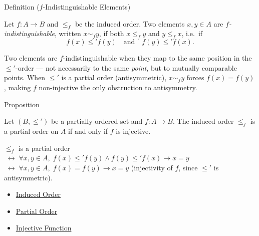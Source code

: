 
\begin{definitionbox}{Definition ($f$-Indistinguishable Elements)}
\begin{definition}\label{def:f-indist}
Let $f : A \to B$ and $\leq_f$ be the induced order. Two elements
$x, y \in A$ are \emph{$f$-indistinguishable}, written $x \sim_f y$,
if both $x \leq_f y$ and $y \leq_f x$, i.e.\ if
\[
f(x) \leq' f(y) \quad \text{and} \quad f(y) \leq' f(x).
\]
\end{definition}
\end{definitionbox}

\begin{remark*}[Intuition]
Two elements are $f$-indistinguishable when they map to the same position
in the $\leq'$-order — not necessarily to the same \emph{point}, but to
mutually comparable points. When $\leq'$ is a partial order (antisymmetric),
$x \sim_f y$ forces $f(x) = f(y)$, making $f$ non-injective the only
obstruction to antisymmetry.
\end{remark*}

\begin{propositionbox}{Proposition}
\begin{proposition}\label{prop:induced-poset}
Let $(B, \leq')$ be a partially ordered set and $f : A \to B$.
The induced order $\leq_f$ is a partial order on $A$ if and only if
$f$ is injective.
\end{proposition}
\end{propositionbox}

\begin{remark*}
$\leq_f$ is a partial order $\;\leftrightarrow\; \forall x,y \in A,\; f(x)\leq' f(y) \wedge f(y)\leq' f(x) \to x=y$ $\;\leftrightarrow\; \forall x,y \in A,\; f(x)=f(y) \to x=y$ (injectivity of $f$, since $\leq'$ is antisymmetric).
\end{remark*}

\begin{dependencies}
\begin{itemize}
  \item \hyperref[def:induced-order]{Induced Order}
  \item \hyperref[def:partial-order]{Partial Order}
  \item \hyperref[def:injective]{Injective Function}
\end{itemize}
\end{dependencies}

